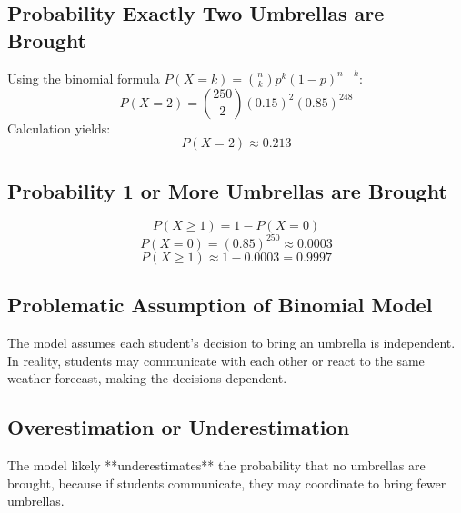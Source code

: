 \documentclass{article}
\begin{document}
\subsection{Probability Exactly Two Umbrellas are Brought}
Using the binomial formula \( P(X = k) = \binom{n}{k} p^k (1-p)^{n-k} \):
\[
P(X = 2) = \binom{250}{2} (0.15)^2 (0.85)^{248}
\]
Calculation yields:
\[
P(X = 2) \approx 0.213
\]

\subsection{Probability 1 or More Umbrellas are Brought}
\[
P(X \geq 1) = 1 - P(X = 0)
\]
\[
P(X = 0) = (0.85)^{250} \approx 0.0003
\]
\[
P(X \geq 1) \approx 1 - 0.0003 = 0.9997
\]

\subsection{Problematic Assumption of Binomial Model}
The model assumes each student’s decision to bring an umbrella is independent. In reality, students may communicate with each other or react to the same weather forecast, making the decisions dependent.

\subsection{Overestimation or Underestimation}
The model likely **underestimates** the probability that no umbrellas are brought, because if students communicate, they may coordinate to bring fewer umbrellas.
\end{document}

